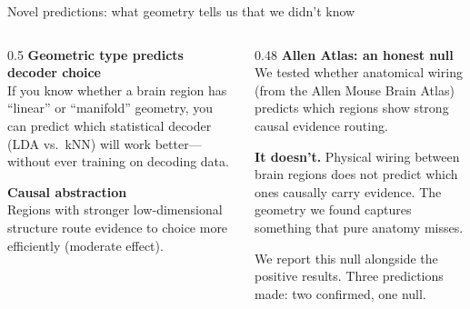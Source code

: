 \documentclass[aspectratio=169,11pt]{beamer}
\begin{document}
\begin{frame}{Novel predictions: what geometry tells us that we didn't know}
\begin{columns}[T]
\begin{column}{0.5\textwidth}
\textbf{Geometric type predicts decoder choice}\\[0.3em]
{\small If you know whether a brain region has ``linear'' or ``manifold'' geometry, you can predict which statistical decoder (LDA vs.\ kNN) will work better---without ever training on decoding data.}

\vspace{0.3em}

\vspace{0.8em}
\textbf{Causal abstraction}\\[0.3em]
{\small Regions with stronger low-dimensional structure route evidence to choice more efficiently (moderate effect).}

\vspace{0.3em}
\end{column}
\begin{column}{0.48\textwidth}
\textbf{Allen Atlas: an honest null}\\[0.3em]
{\small We tested whether anatomical wiring (from the Allen Mouse Brain Atlas) predicts which regions show strong causal evidence routing.}

\vspace{0.3em}

\vspace{0.5em}
{\small \textbf{It doesn't.} Physical wiring between brain regions does not predict which ones causally carry evidence. The geometry we found captures something that pure anatomy misses.}

\vspace{0.8em}
{\small We report this null alongside the positive results. Three predictions made: two confirmed, one null.}
\end{column}
\end{columns}
\end{frame}
\end{document}
